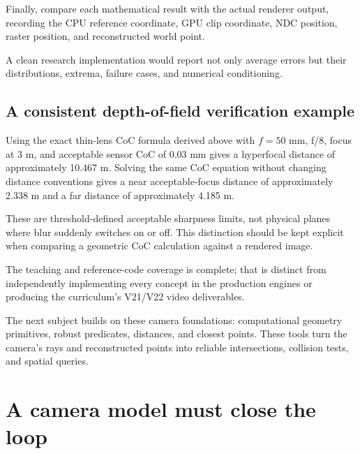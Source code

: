 Finally, compare each mathematical result with the actual renderer output, recording the CPU reference coordinate, GPU clip coordinate, NDC position, raster position, and reconstructed world point.

A clean research implementation would report not only average errors but their distributions, extrema, failure cases, and numerical conditioning.

\subsection{A consistent depth-of-field verification example}\label{02-foundations-ii-ch037-a-consistent-depth-of-field-verification-example}

\hypertarget{02-foundations-ii-ch037-a-consistent-depth-of-field-verification-example}{}

Using the exact thin-lens CoC formula derived above with \(f=50\) mm, f/8, focus at 3 m, and acceptable sensor CoC of 0.03 mm gives a hyperfocal distance of approximately 10.467 m. Solving the same CoC equation without changing distance conventions gives a near acceptable-focus distance of approximately 2.338 m and a far distance of approximately 4.185 m.

These are threshold-defined acceptable sharpness limits, not physical planes where blur suddenly switches on or off. This distinction should be kept explicit when comparing a geometric CoC calculation against a rendered image.

The teaching and reference-code coverage is complete; that is distinct from independently implementing every concept in the production engines or producing the curriculum's V21/V22 video deliverables.

The next subject builds on these camera foundations: computational geometry primitives, robust predicates, distances, and closest points. These tools turn the camera's rays and reconstructed points into reliable intersections, collision tests, and spatial queries.

\section{A camera model must close the loop}\label{02-foundations-ii-ch037-a-camera-model-must-close-the-loop}

\hypertarget{02-foundations-ii-ch037-a-camera-model-must-close-the-loop}{}


